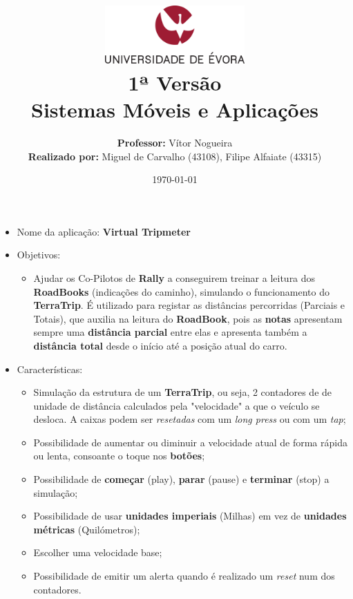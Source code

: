 \documentclass[11pt]{article}
\title
{
    \includegraphics[width=0.4\textwidth]{imgs/university.png}
    \\[0.1cm]
    \textbf{1ª Versão} \\
    Sistemas Móveis e Aplicações
}
\author
{
    \textbf{Professor:} Vítor Nogueira \\
    \textbf{Realizado por:} Miguel de Carvalho (43108), Filipe Alfaiate (43315)
}
\date{\today}
\begin{document}
\maketitle

\begin{itemize}
    \item Nome da aplicação: \textbf{Virtual Tripmeter}
    \item Objetivos: 
    \begin{itemize}
        \item Ajudar os Co-Pilotos de \textbf{Rally} a conseguirem treinar a leitura
        dos \textbf{RoadBooks} (indicações do caminho), simulando o funcionamento do
        \textbf{TerraTrip}. É utilizado para registar as distâncias percorridas (Parciais e
        Totais), que auxilia na leitura do \textbf{RoadBook}, pois as \textbf{notas} apresentam
        sempre uma \textbf{distância parcial} entre elas e apresenta também a \textbf{distância 
        total} desde o início até a posição atual do carro.
    \end{itemize}
    \item Características:
    \begin{itemize}
        \item Simulação da estrutura de um \textbf{TerraTrip}, ou seja, 2 contadores de
        de unidade de distância calculados pela "velocidade" a que o veículo se desloca.
        A caixas podem ser \textit{resetadas} com um \textit{long press} ou com um \textit{tap};
        \item Possibilidade de aumentar ou diminuir a velocidade atual de forma rápida ou lenta,
        consoante o toque nos \textbf{botões};
        \item Possibilidade de \textbf{começar} (play), \textbf{parar} (pause) e \textbf{terminar} (stop) a simulação;
        \item Possibilidade de usar \textbf{unidades imperiais} (Milhas) em vez de 
        \textbf{unidades métricas} (Quilómetros);
        \item Escolher uma velocidade base;
        \item Possibilidade de emitir um alerta quando é realizado um \textit{reset} num
        dos contadores.
    \end{itemize}
\end{itemize}

\end{document}
